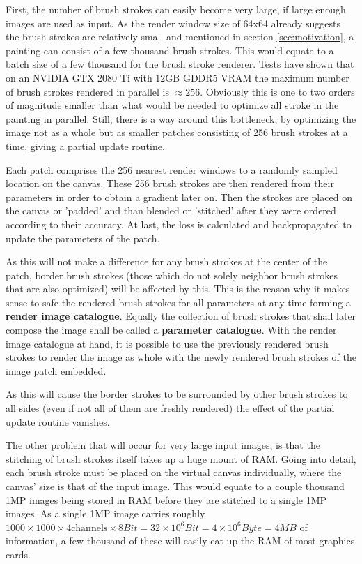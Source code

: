 First, the number of brush strokes can easily become very large, if large enough
images are used as input.
As the render window size of 64x64 already suggests the brush strokes are relatively
small and mentioned in section \ref{sec:motivation}, a painting can consist of a
few thousand brush strokes.
This would equate to a batch size of a few thousand for the brush stroke renderer.
Tests have shown that on an NVIDIA GTX 2080 Ti with 12GB GDDR5 VRAM the maximum number
of brush strokes rendered in parallel is $\approx 256$.
Obviously this is one to two orders of magnitude smaller than what would be needed
to optimize all stroke in the painting in parallel.
Still, there is a way around this bottleneck, by optimizing the image not as a whole
but as smaller patches consisting of 256 brush strokes at a time, giving a partial
update routine.

Each patch comprises the 256 nearest render windows to a randomly sampled location
on the canvas.
These 256 brush strokes are then rendered from their parameters in order to obtain
a gradient later on.
Then the strokes are placed on the canvas or 'padded' and than blended or 'stitched'
after they were ordered according to their accuracy.
At last, the loss is calculated and backpropagated to update the parameters of the patch.

As this will not make a difference for any brush strokes at the center of the patch,
border brush strokes (those which do not solely neighbor brush strokes that are also
optimized) will be affected by this.
This is the reason why it makes sense to safe the rendered brush strokes for all
parameters at any time forming a \textbf{render image catalogue}.
Equally the collection of brush strokes that shall later compose the image shall
be called a \textbf{parameter catalogue}.
With the render image catalogue at hand, it is possible to use the previously rendered
brush strokes to render the image as whole with the newly rendered brush strokes
of the image patch embedded.

As this will cause the border strokes to be surrounded by other brush strokes to all
sides (even if not all of them are freshly rendered) the effect of the partial update
routine vanishes.

The other problem that will occur for very large input images, is that the stitching
of brush strokes itself takes up a huge mount of RAM.
Going into detail, each brush stroke must be placed on the virtual canvas individually, 
where the canvas' size is that of the input image.
This would equate to a couple thousand 1MP images being stored in RAM before they
are stitched to a single 1MP images.
As a single 1MP image carries roughly $1000 \times 1000 \times 4 \text{channels}
\times 8 Bit = 32 \times 10^{6} Bit = 4 \times 10^{6} Byte = 4 MB$ of information,
a few thousand of these will easily eat up the RAM of most graphics cards.

